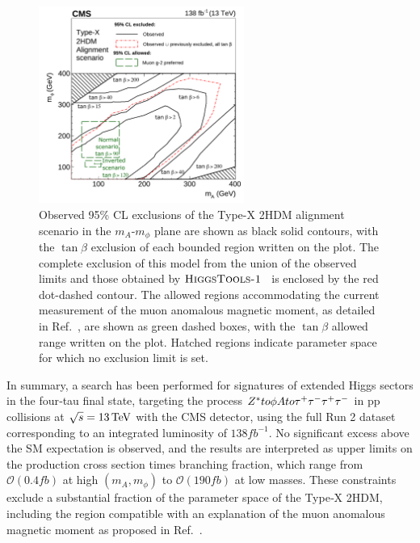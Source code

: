 \begin{figure}[!htbp]
  \centering
  \includegraphics[width=0.6\textwidth]{Figures/Chapter6/md_2d_hb_gm2_contour.pdf}
  \caption[Summary of exclusion contours in the $m_A-m_\phi$ plane.]{
   Observed 95\% CL exclusions of the Type-X 2HDM alignment scenario in the $m_A$-$m_\phi$ plane are shown as black solid contours, with the $\tan\beta$ exclusion of each bounded region written on the plot.
   The complete exclusion of this model from the union of the observed limits and those obtained by $\textsc{HiggsTools-1}$~\cite{Bahl:2022igd} is enclosed by the red dot-dashed contour.
   The allowed regions accommodating the current measurement of the muon anomalous magnetic moment, as detailed in Ref.~\cite{TypeX_2HDM}, are shown as green dashed boxes, with the $\tan\beta$ allowed range written on the plot. Hatched regions indicate parameter space for which no exclusion limit is set.
  }
  \label{Figure:Chapter6_model_dependent_2d}
\end{figure}

In summary, a search has been performed for signatures of extended Higgs sectors in the four‑tau final state, targeting the process $Z^* to \phi A to \tau^+\tau^-\tau^+\tau^-$ in pp collisions at $\sqrt{s} = 13\,\text{Te\hspace{-.08em}V}$ with the CMS detector, using the full Run 2 dataset corresponding to an integrated luminosity of $138\unit{fb}^{-1}$. No significant excess above the SM expectation is observed, and the results are interpreted as upper limits on the production cross section times branching fraction, which range from $\mathcal{O}(0.4\unit{fb})$ at high $(m_A, m_\phi)$ to $\mathcal{O}(190\unit{fb})$ at low masses. These constraints exclude a substantial fraction of the parameter space of the Type‑X 2HDM, including the region compatible with an explanation of the muon anomalous magnetic moment as proposed in Ref.~\cite{TypeX_2HDM}.











